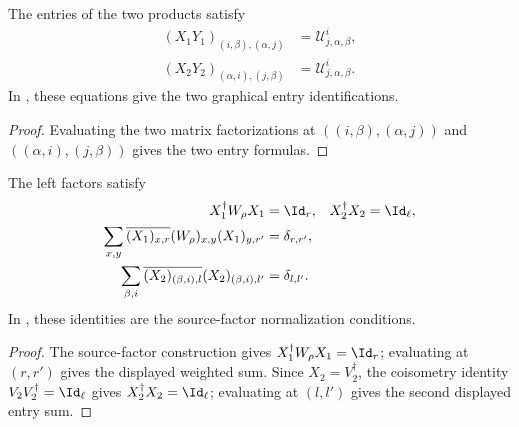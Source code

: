 \begin{lemma}
    \label{thm:mpu_source_factorization_entries}
    \leanok
    The entries of the two products satisfy
    \begin{align}
        (X_1Y_1)_{(i,\beta),(\alpha,j)}
         & =\mathcal U^i_{j,\alpha,\beta}, \\
        (X_2Y_2)_{(\alpha,i),(j,\beta)}
         & =\mathcal U^i_{j,\alpha,\beta}.
    \end{align}
    In \cite[Section~III]{Cirac2017MPU}, these equations give the two graphical entry
    identifications.
\end{lemma}

\begin{proof}
    \leanok
    Evaluating the two matrix factorizations at
    $((i,\beta),(\alpha,j))$ and $((\alpha,i),(j,\beta))$ gives the two entry formulas.
\end{proof}

\begin{lemma}
    \label{thm:mpu_source_factor_normalizations}
    \leanok
    The left factors satisfy
    \begin{align}
        X_1^\dagger W_\rho X_1 & =\Id_r,
                               & X_2^\dagger X_2 & =\Id_\ell, \\
        \sum_{x,y}\overline{(X_1)_{x,r}}(W_\rho)_{x,y}(X_1)_{y,r'}
                               & =\delta_{r,r'},              \\
        \sum_{\beta,i}\overline{(X_2)_{(\beta,i),l}}(X_2)_{(\beta,i),l'}
                               & =\delta_{l,l'}.
    \end{align}
    In \cite[Section~III]{Cirac2017MPU}, these identities are the source-factor normalization conditions.
\end{lemma}

\begin{proof}
    \leanok
    The source-factor construction gives
    $X_1^\dagger W_\rho X_1=\Id_r$; evaluating at $(r,r')$ gives the displayed
    weighted sum. Since $X_2=V_2^\dagger$, the
    coisometry identity $V_2V_2^\dagger=\Id_\ell$ gives
    $X_2^\dagger X_2=\Id_\ell$; evaluating at $(l,l')$ gives the second
    displayed entry sum.
\end{proof}

